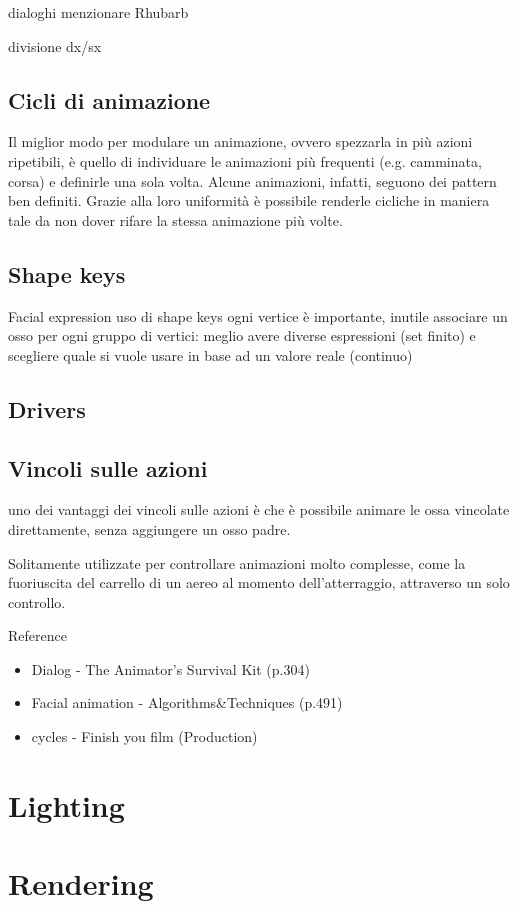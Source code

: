 dialoghi
menzionare Rhubarb

divisione dx/sx

\subsection{Cicli di animazione}
Il miglior modo per modulare un animazione, ovvero spezzarla in più azioni ripetibili, è quello di individuare le animazioni più frequenti (e.g. camminata, corsa) e definirle una sola volta.
Alcune animazioni, infatti, seguono dei pattern ben definiti.
Grazie alla loro uniformità è possibile renderle cicliche in maniera tale da non dover rifare la stessa animazione più volte.
\subsection{Shape keys}
Facial expression
uso di shape keys
ogni vertice è importante, inutile associare un osso per ogni gruppo di vertici: meglio avere diverse espressioni (set finito) e scegliere quale si vuole usare in base ad un valore reale (continuo)
\subsection{Drivers}
\subsection{Vincoli sulle azioni}
uno dei vantaggi dei vincoli sulle azioni è che è possibile animare le ossa vincolate direttamente, senza aggiungere un osso padre.

Solitamente utilizzate per controllare animazioni molto complesse, come la fuoriuscita del carrello di un aereo al momento dell'atterraggio, attraverso un solo controllo.

Reference
\begin{itemize}
    \item Dialog - The Animator's Survival Kit (p.304) 
    \item Facial animation - Algorithms\&Techniques (p.491)
    \item cycles - Finish you film (Production)
\end{itemize}
\section{Lighting}
\section{Rendering}

